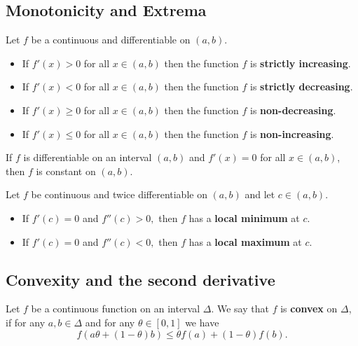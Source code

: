 \documentclass[12pt, a4paper]{article}
\begin{document}
\subsection{Monotonicity and Extrema}

\begin{theorem}
    Let \(f\) be a continuous and differentiable on \((a,b)\).
    \begin{itemize}
        \item If \(f'(x)>0\) for all \(x\in (a,b)\) then the function \(f\) is \textbf{strictly increasing}.
        \item If \(f'(x)<0\) for all \(x\in (a,b)\) then the function \(f\) is \textbf{strictly decreasing}.
        \item If \(f'(x)\geq 0\) for all \(x\in (a,b)\) then the function \(f\) is \textbf{non-decreasing}.
        \item If \(f'(x)\leq 0\) for all \(x\in (a,b)\) then the function \(f\) is \textbf{non-increasing}.
    \end{itemize}
\end{theorem}

\begin{corollary}
    If \(f\) is differentiable on an interval \((a,b)\) and \(f'(x)=0\) for all \(x\in (a,b)\), then \(f\) is constant on \((a,b)\).
\end{corollary}

\begin{mdthm}
    Let \(f\) be continuous and twice differentiable on \((a,b)\) and let \(c \in (a,b)\).
    \begin{itemize}
        \item If \(f'(c) = 0\) and \(f''(c)>0,\) then \(f\) has a \textbf{local minimum} at \(c\).
        \item If \(f'(c) = 0\) and \(f''(c)<0,\) then \(f\) has a \textbf{local maximum} at \(c\).
    \end{itemize}
\end{mdthm}

\subsection{Convexity and the second derivative}

\begin{definition}
    Let \(f\) be a continuous function on an interval \(\Delta\). We say that \(f\) is \textbf{convex} on \(\Delta\), if for any \(a,b \in \Delta\) and for any \(\theta \in [0,1]\) we have
    \[f(a \theta +(1-\theta)b)\leq \theta f(a) +(1-\theta)f(b).\]
\end{definition}
\end{document}
